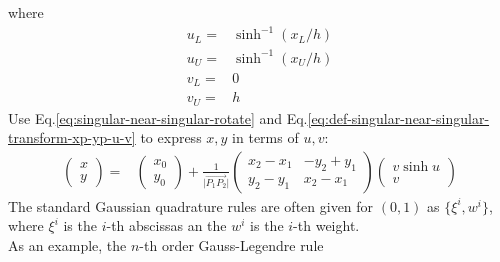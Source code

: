 \documentclass [10pt,letterpaper]{article}
\begin{document}
where
\begin{equation} \label{eq:def-singular-near-singular-uL-uU-vL-vU}
	\begin{split}
		u_L	=&	\sinh^{-1}(x_L/h)		\\
		u_U	=&	\sinh^{-1}(x_U/h)		\\
		v_L	=&	0				\\
		v_U	=&	h				
	\end{split}
\end{equation}
Use Eq.\eqref{eq:singular-near-singular-rotate} 
and Eq.\eqref{eq:def-singular-near-singular-transform-xp-yp-u-v} 
to express $x,y$ in terms of $u,v$:
\begin{equation} \label{eq:singular-near-singular-x-y-u-v}
	\begin{split} 
		\begin{pmatrix}
			x					\\
			y
		\end{pmatrix}
		=&
		\begin{pmatrix}
			x_0					\\
			y_0
		\end{pmatrix}
		+
		\frac{1}{\lvert \overrightarrow{P_1 P_2} \rvert}
		\begin{pmatrix} 
			x_2-x_1 	& 	-y_2+y_1	\\
			y_2-y_1 	& 	x_2-x_1		
		\end{pmatrix}
		\begin{pmatrix}
			v \sinh{u}				\\
			v
		\end{pmatrix}
	\end{split}
\end{equation}
The standard Gaussian quadrature rules are often given for $(0,1)$ as $\{\xi^i,w^i\}$,
where $\xi^i$ is the $i$-th abscissas an the $w^i$ is the $i$-th weight.
\\
As an example, the $n$-th order Gauss-Legendre rule 
\end{document}
